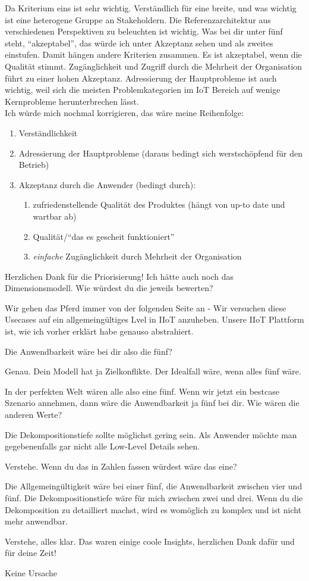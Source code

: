 \PE Da Kriterium eins ist sehr wichtig. Verständlich für eine breite, und was wichtig ist eine heterogene Gruppe an Stakeholdern. Die Referenzarchitektur aus verschiedenen Perspektiven zu beleuchten ist wichtig. Was bei dir unter fünf steht, \enquote{akzeptabel}, das würde ich unter Akzeptanz sehen und als zweites einstufen. Damit hängen andere Kriterien zusammen. Es ist akzeptabel, wenn die Qualität stimmt. Zugänglichkeit und Zugriff durch die Mehrheit der Organisation führt zu einer hohen Akzeptanz. Adressierung der Hauptprobleme ist auch wichtig, weil sich die meisten Problemkategorien im \ac{IoT} Bereich auf wenige Kernprobleme herunterbrechen lässt. \\
Ich würde mich nochmal korrigieren, das wäre meine Reihenfolge:
\begin{enumerate}
    \item Verständlichkeit
    \item Adressierung der Hauptprobleme (daraus bedingt sich werstschöpfend für den Betrieb)
    \item Akzeptanz durch die Anwender (bedingt durch):
    \begin{enumerate}
        \item zufriedenstellende Qualität des Produktes (hängt von up-to date und wartbar ab)
        \item Qualität/\enquote{das es gescheit funktioniert}
        \item \textit{einfache} Zugänglichkeit durch Mehrheit der Organisation
    \end{enumerate}
\end{enumerate}

\LF Herzlichen  Dank für die Priorisierung! Ich hätte auch noch das Dimensionsmodell. Wie würdest du die jeweils bewerten?

\PE Wir gehen das Pferd immer von der folgenden Seite an - Wir versuchen diese Usecases auf ein allgemeingültiges Lvel in \ac{IIoT} anzuheben. Unsere \ac{IIoT} Plattform ist, wie ich vorher erklärt habe genauso abstrahiert.

\LF Die Anwendbarkeit wäre bei dir also die fünf?

\PE Genau. Dein Modell hat ja Zielkonflikte. Der Idealfall wäre, wenn alles fünf wäre. 

\LF In der perfekten Welt wären alle also eine fünf. Wenn wir jetzt ein bestcase Szenario annehmen, dann wäre die Anwendbarkeit ja fünf bei dir. Wie wären die anderen Werte?

\PE Die Dekompositionstiefe sollte möglichst gering sein. Als Anwender möchte man gegebenenfalls gar nicht alle Low-Level Details sehen.

\LF Verstehe. Wenn du das in Zahlen fassen würdest wäre das eine?

\PE Die Allgemeingültigkeit wäre bei einer fünf, die Anwendbarkeit zwischen vier und fünf. Die Dekompositionstiefe wäre für mich zwischen zwei und drei. Wenn du die Dekomposition zu detailliert machst, wird es womöglich zu komplex und ist nicht mehr anwendbar.

\LF Verstehe, alles klar. Das waren einige coole Insights, herzlichen Dank dafür und für deine Zeit!

\PE Keine Ursache